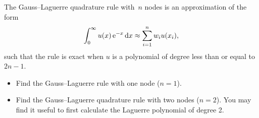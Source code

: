 \begin{exercise}
    The Gauss--Laguerre quadrature rule with~$n$ nodes is an approximation of the form
    \[
        \int_{0}^{\infty} u(x) \, \mathrm e^{-x} \, \mathrm d x \approx \sum_{i=1}^{n} w_i u(x_i),
    \]
    such that the rule is exact when $u$ is a polynomial of degree less than or equal to $2n-1$.
    \begin{itemize}
        \item
            Find the Gauss--Laguerre rule with one node ($n = 1$).

        \item
            Find the Gauss--Laguerre quadrature rule with two nodes ($n = 2$).
            You may find it useful to first calculate the Laguerre polynomial of degree 2.
    \end{itemize}
\end{exercise}
